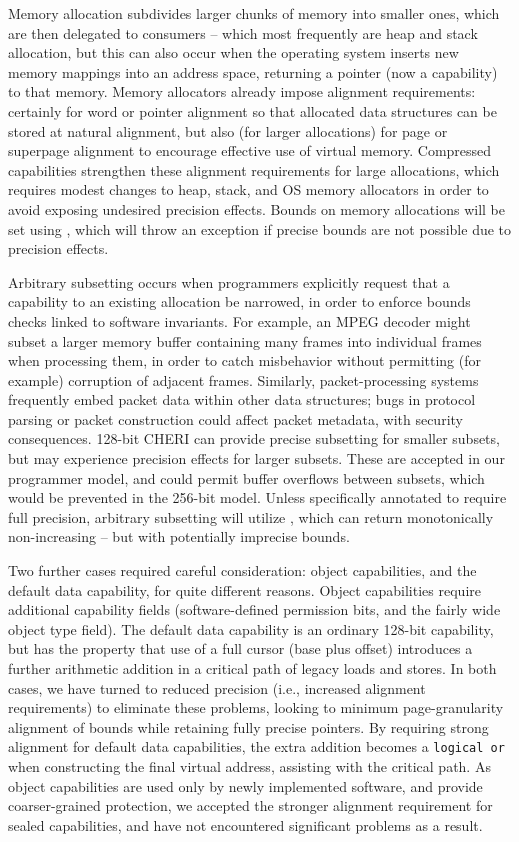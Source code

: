 Memory allocation subdivides larger chunks of memory into smaller ones, which
are then delegated to consumers -- which most frequently are heap and stack
allocation, but this
can also occur when the operating system inserts new memory
mappings into an address space, returning a pointer (now a capability) to that
memory.
Memory allocators already impose alignment requirements: certainly for word or
pointer alignment so that allocated data structures can be stored at natural
alignment, but also (for larger allocations) for page or superpage alignment to
encourage effective use of virtual memory.
Compressed capabilities strengthen these alignment requirements for large
allocations, which requires modest changes to heap, stack, and OS memory
allocators in order to avoid exposing undesired precision effects.
Bounds on memory allocations will be set using ,
which will throw an exception if precise bounds are not possible due to
precision effects.

Arbitrary subsetting occurs when programmers explicitly request that a
capability to an existing allocation be narrowed, in order to enforce bounds
checks linked to software invariants.
For example, an MPEG decoder might subset a larger memory buffer containing
many frames into individual frames when processing them, in order to catch
misbehavior without permitting (for example) corruption of adjacent frames.
Similarly, packet-processing systems frequently embed packet data within other
data structures; bugs in protocol parsing or packet construction could affect
packet metadata, with security consequences.
128-bit CHERI can provide precise subsetting for smaller subsets, %
but may experience precision effects for larger subsets.
These are accepted in our programmer model, and could permit buffer overflows
between subsets, which would be prevented in the 256-bit model.
Unless specifically annotated to require full precision, arbitrary subsetting
will utilize , which can return monotonically
non-increasing -- but with potentially imprecise bounds.

Two further cases required careful consideration: object capabilities, and the
default data capability, for quite different reasons.
Object capabilities require additional capability fields (software-defined
permission bits, and the fairly wide object type field).
The default data capability is an ordinary 128-bit capability, but has the
property that use of a full cursor (base plus offset) introduces a further
arithmetic addition in a critical path of legacy loads and stores.
In both cases, we have turned to reduced precision (i.e., increased alignment
requirements) to eliminate these problems, looking to minimum page-granularity
alignment of bounds while retaining fully precise pointers.
By requiring strong alignment for default data capabilities, the extra
addition becomes a \texttt{logical or} when constructing the final virtual address,
assisting with the critical path.
As object capabilities are used only by newly implemented software, and
provide coarser-grained protection, we accepted the stronger alignment
requirement for sealed capabilities, and have not encountered significant
problems as a result.

